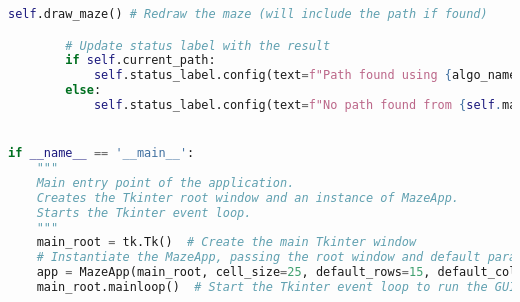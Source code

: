 \documentclass[UTF8]{report}
\theoremstyle{MyLineTheoremStyle} %
\theoremstyle{MyBlockTheoremStyle} %
\theoremstyle{MySubsubsectionStyle} %
\begin{document}
\begin{lstlisting}[language=Python, caption={迷宫生成与求解程序代码}]
        self.draw_maze() # Redraw the maze (will include the path if found)

        # Update status label with the result
        if self.current_path:
            self.status_label.config(text=f"Path found using {algo_name} with {len(self.current_path)} steps.")
        else:
            self.status_label.config(text=f"No path found from {self.maze.start_node} to {self.maze.end_node} using {algo_name}.")


if __name__ == '__main__':
    """
    Main entry point of the application.
    Creates the Tkinter root window and an instance of MazeApp.
    Starts the Tkinter event loop.
    """
    main_root = tk.Tk()  # Create the main Tkinter window
    # Instantiate the MazeApp, passing the root window and default parameters
    app = MazeApp(main_root, cell_size=25, default_rows=15, default_cols=20, default_tri_rows=8) 
    main_root.mainloop()  # Start the Tkinter event loop to run the GUI

\end{lstlisting}
\end{document}
